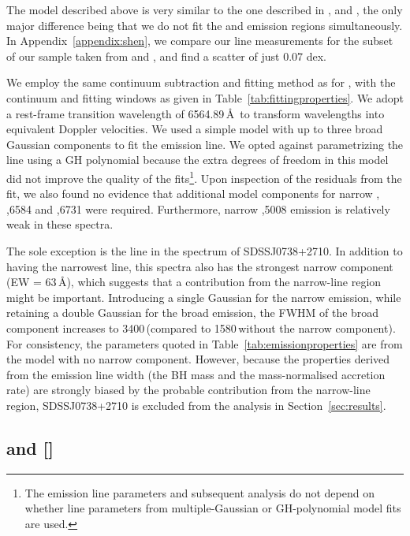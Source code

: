The model described above is very similar to the one described in \citet{shen16a}, \citet{shen12} and \citet{shen11}, the only major difference being that we do not fit the \ha and \hb emission regions simultaneously. 
In Appendix~\ref{appendix:shen}, we compare our \ha line measurements for the subset of our sample taken from \citet{shen16a} and \citet{shen12}, and find a scatter of just 0.07 dex. 

We employ the same continuum subtraction and fitting method as for , with the continuum and fitting windows as given in Table~\ref{tab:fittingproperties}. 
We adopt a rest-frame transition wavelength of 6564.89\,\AA\, to transform wavelengths into equivalent Doppler velocities. 
We used a simple model with up to three broad Gaussian components to fit the \ha emission line.
We opted against parametrizing the \ha line using a GH polynomial because the extra degrees of freedom in this model did not improve the quality of the fits\footnote{The emission line parameters and subsequent analysis do not depend on whether line parameters from multiple-Gaussian or GH-polynomial model fits are used.}.
Upon inspection of the residuals from the fit, we also found no evidence that additional model components for narrow \hans, ,6584 and ,6731 were required.
Furthermore, narrow ,5008 emission is relatively weak in these spectra.

The sole exception is the \ha line in the spectrum of SDSSJ0738+2710.
In addition to having the narrowest \ha line, this spectra also has the strongest narrow  component (EW = 63\,\AA), which suggests that a contribution from the narrow-line region might be important.  
Introducing a single Gaussian for the narrow emission, while retaining a double Gaussian for the broad emission, the FWHM of the broad component increases to 3400\,\kms (compared to 1580\,\kms without the narrow component). 
For consistency, the parameters quoted in Table~\ref{tab:emissionproperties} are from the model with no narrow component. 
However, because the properties derived from the emission line width (the BH mass and the mass-normalised accretion rate) are strongly biased by the probable contribution from the narrow-line region, SDSSJ0738+2710 is excluded from the analysis in Section~\ref{sec:results}. 


\subsection{\hb and []}

